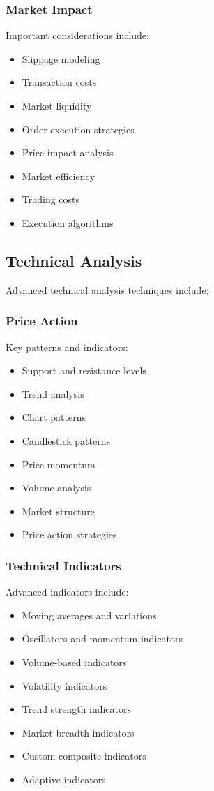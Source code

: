 \documentclass[conference]{IEEEtran}
\begin{document}
\subsubsection{Market Impact}
Important considerations include:
\begin{itemize}
    \item Slippage modeling
    \item Transaction costs
    \item Market liquidity
    \item Order execution strategies
    \item Price impact analysis
    \item Market efficiency
    \item Trading costs
    \item Execution algorithms
\end{itemize}

\subsection{Technical Analysis}
Advanced technical analysis techniques include:

\subsubsection{Price Action}
Key patterns and indicators:
\begin{itemize}
    \item Support and resistance levels
    \item Trend analysis
    \item Chart patterns
    \item Candlestick patterns
    \item Price momentum
    \item Volume analysis
    \item Market structure
    \item Price action strategies
\end{itemize}

\subsubsection{Technical Indicators}
Advanced indicators include:
\begin{itemize}
    \item Moving averages and variations
    \item Oscillators and momentum indicators
    \item Volume-based indicators
    \item Volatility indicators
    \item Trend strength indicators
    \item Market breadth indicators
    \item Custom composite indicators
    \item Adaptive indicators
\end{itemize}
\end{document}
